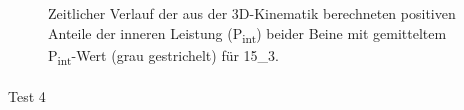 \documentclass[
  letterpaper,
  DIV=11]{scrartcl}
\makeatletter
\let\oldparagraph\paragraph
\renewcommand{\paragraph}{
    \@ifstar
      \xxxParagraphStar
      \xxxParagraphNoStar
  }
\newcommand{\xxxParagraphStar}[1]{\oldparagraph*{#1}\mbox{}}
\newcommand{\xxxParagraphNoStar}[1]{\oldparagraph{#1}\mbox{}}
\makeatother
\begin{document}
\begin{figure}


\caption{\label{fig-PInt_Kinematik_15_3}Zeitlicher Verlauf der aus der
3D-Kinematik berechneten positiven Anteile der inneren Leistung
(P\textsubscript{int}) beider Beine mit gemitteltem
P\textsubscript{int}-Wert (grau gestrichelt) für 15\_3.}

\end{figure}%

\paragraph{Test 4}
\end{document}
